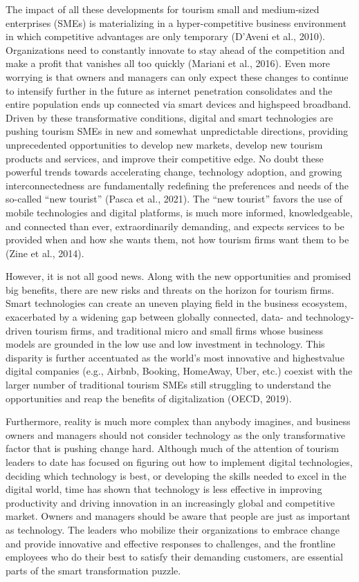 \documentclass[
  letterpaper,
  DIV=11,
  numbers=noendperiod]{scrreprt}
\begin{document}
The impact of all these developments for tourism small and medium-sized
enterprises (SMEs) is materializing in a hyper-competitive business
environment in which competitive advantages are only temporary (D'Aveni
et al., 2010). Organizations need to constantly innovate to stay ahead
of the competition and make a profit that vanishes all too quickly
(Mariani et al., 2016). Even more worrying is that owners and managers
can only expect these changes to continue to intensify further in the
future as internet penetration consolidates and the entire population
ends up connected via smart devices and highspeed broadband. Driven by
these transformative conditions, digital and smart technologies are
pushing tourism SMEs in new and somewhat unpredictable directions,
providing unprecedented opportunities to develop new markets, develop
new tourism products and services, and improve their competitive edge.
No doubt these powerful trends towards accelerating change, technology
adoption, and growing interconnectedness are fundamentally redefining
the preferences and needs of the so-called ``new tourist'' (Pasca et
al., 2021). The ``new tourist'' favors the use of mobile technologies
and digital platforms, is much more informed, knowledgeable, and
connected than ever, extraordinarily demanding, and expects services to
be provided when and how she wants them, not how tourism firms want them
to be (Zine et al., 2014).

However, it is not all good news. Along with the new opportunities and
promised big benefits, there are new risks and threats on the horizon
for tourism firms. Smart technologies can create an uneven playing field
in the business ecosystem, exacerbated by a widening gap between
globally connected, data- and technology-driven tourism firms, and
traditional micro and small firms whose business models are grounded in
the low use and low investment in technology. This disparity is further
accentuated as the world's most innovative and highestvalue digital
companies (e.g., Airbnb, Booking, HomeAway, Uber, etc.) coexist with the
larger number of traditional tourism SMEs still struggling to understand
the opportunities and reap the benefits of digitalization (OECD, 2019).

Furthermore, reality is much more complex than anybody imagines, and
business owners and managers should not consider technology as the only
transformative factor that is pushing change hard. Although much of the
attention of tourism leaders to date has focused on figuring out how to
implement digital technologies, deciding which technology is best, or
developing the skills needed to excel in the digital world, time has
shown that technology is less effective in improving productivity and
driving innovation in an increasingly global and competitive market.
Owners and managers should be aware that people are just as important as
technology. The leaders who mobilize their organizations to embrace
change and provide innovative and effective responses to challenges, and
the frontline employees who do their best to satisfy their demanding
customers, are essential parts of the smart transformation puzzle.
\end{document}
